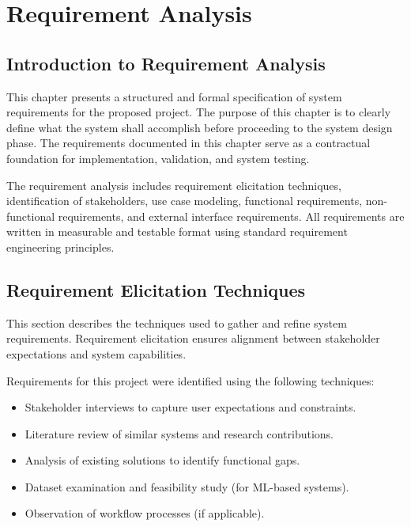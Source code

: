 
\chapter{Requirement Analysis}

\section{Introduction to Requirement Analysis}

This chapter presents a structured and formal specification of system requirements for the proposed project. The purpose of this chapter is to clearly define what the system shall accomplish before proceeding to the system design phase. The requirements documented in this chapter serve as a contractual foundation for implementation, validation, and system testing.

The requirement analysis includes requirement elicitation techniques, identification of stakeholders, use case modeling, functional requirements, non-functional requirements, and external interface requirements. All requirements are written in measurable and testable format using standard requirement engineering principles.


\section{Requirement Elicitation Techniques}

This section describes the techniques used to gather and refine system requirements. Requirement elicitation ensures alignment between stakeholder expectations and system capabilities.

Requirements for this project were identified using the following techniques:

\begin{itemize}
    \item Stakeholder interviews to capture user expectations and constraints.
    \item Literature review of similar systems and research contributions.
    \item Analysis of existing solutions to identify functional gaps.
    \item Dataset examination and feasibility study (for ML-based systems).
    \item Observation of workflow processes (if applicable).
\end{itemize}


